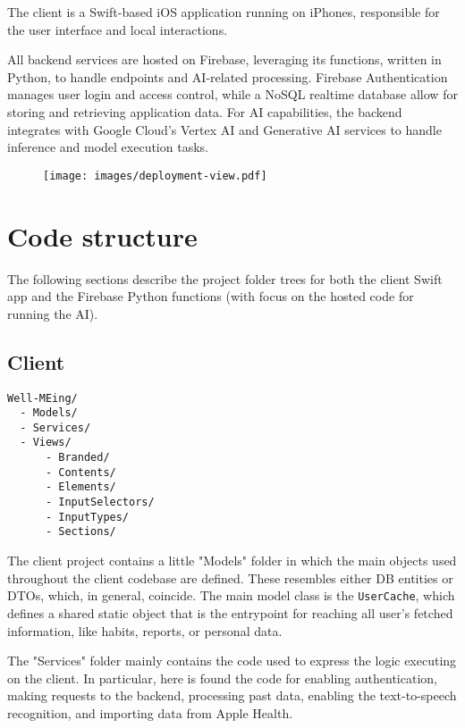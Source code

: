 \documentclass{article}
\begin{document}
The client is a Swift-based iOS application running on iPhones, responsible for the user interface and local interactions.

All backend services are hosted on Firebase, leveraging its functions, written in Python, to handle endpoints and AI-related processing.
Firebase Authentication manages user login and access control, while a NoSQL realtime database allow for storing and retrieving application data.
For AI capabilities, the backend integrates with Google Cloud's Vertex AI and Generative AI services to handle inference and model execution tasks.

\begin{figure}[H]
	\centering
	\texttt{[image: images/deployment-view.pdf]}
\end{figure}

\section{Code structure}

The following sections describe the project folder trees for both the client Swift app and the Firebase Python functions (with focus on the hosted code for running the AI).

\subsection{Client}

\begin{verbatim}
Well-MEing/
  - Models/
  - Services/
  - Views/
      - Branded/
      - Contents/
      - Elements/
      - InputSelectors/
      - InputTypes/
      - Sections/
\end{verbatim}

The client project contains a little "Models" folder in which the main objects used throughout the client codebase are defined.
These resembles either DB entities or DTOs, which, in general, coincide.
The main model class is the \verb|UserCache|, which defines a shared static object that is the entrypoint for reaching all user's fetched information, like habits, reports, or personal data.

The "Services" folder mainly contains the code used to express the logic executing on the client.
In particular, here is found the code for enabling authentication, making requests to the backend, processing past data, enabling the text-to-speech recognition, and importing data from Apple Health.
\end{document}
